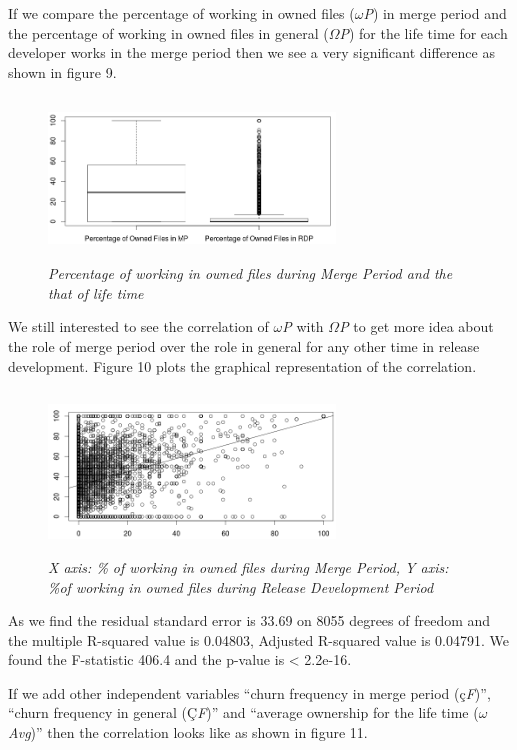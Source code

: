 \documentclass{acm_proc_article-sp}
\begin{document}
If we compare the percentage of working in owned files ($\omega$\textit{P}) in merge period and the percentage of working in owned files in general ($\Omega$\textit{P}) for the life time for each developer works in the merge period then we see a very significant difference as shown in figure 9.
\begin{figure}
\begin{center}
\includegraphics[height=1.7in,width=3in]{ownedFilesMPRDPBox.png}
\caption{\small \sl Percentage of working in owned files during Merge Period and the that of life time}
\end{center}
\end{figure}
We still interested to see the correlation of $\omega$\textit{P} with $\Omega$\textit{P} to get more idea about the role of merge period over the role in general for any other time in release development. Figure 10 plots the graphical representation of the correlation.
\begin{figure}
\begin{center}
\includegraphics[height=1.7in,width=3in]{owPercentMPRDPCorr.png}
\caption{\small \sl X axis: \% of working in owned files during Merge Period, Y axis: \%of working in owned files during Release Development Period}
\end{center}
\end{figure}
As we find the residual standard error is 33.69 on 8055 degrees of freedom  and the multiple R-squared value is 0.04803, Adjusted R-squared value is 0.04791. We found the F-statistic 406.4 and the p-value is < 2.2e-16.

If we add other independent variables ``churn frequency in merge period (\c{c}\textit{F})'', ``churn frequency in general (\c{C}\textit{F})'' and ``average ownership for the life time ($\omega$\textit{Avg})'' then the correlation looks like as shown in figure 11.
\end{document}
